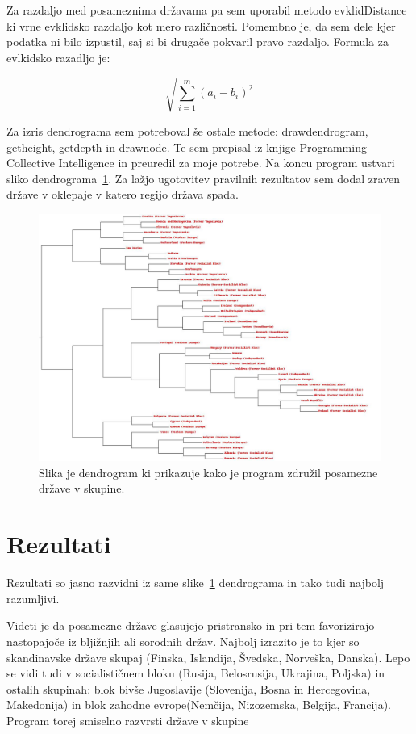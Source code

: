 \documentclass[a4paper,11pt]{article}
\begin{document}
Za razdaljo med posameznima državama pa sem uporabil metodo evklidDistance ki vrne evklidsko razdaljo kot mero različnosti. Pomembno je, da sem dele kjer podatka ni bilo izpustil, saj si bi drugače pokvaril pravo razdaljo. Formula za evlkidsko razadljo je:

\begin{equation}
\sqrt{ 
\sum\limits_{i=1}^{m}(a_{i}-b_{i})^{2}
}
\end{equation}


Za izris dendrograma sem potreboval še ostale metode: drawdendrogram, getheight, getdepth in drawnode. Te sem prepisal iz knjige Programming Collective Intelligence in preuredil za moje potrebe. Na koncu program ustvari sliko dendrograma~\ref{slika1}. Za lažjo ugotovitev pravilnih rezultatov sem dodal zraven države v oklepaje v katero regijo država spada.

\begin{figure}[htbp]
\begin{center}
\includegraphics[scale=0.3]{final-dendrogram.jpg}
\caption{Slika je dendrogram ki prikazuje kako je program združil posamezne države v skupine.}
\label{slika1}
\end{center}
\end{figure}

\section{Rezultati}

Rezultati so jasno razvidni iz same slike~\ref{slika1} dendrograma in tako tudi najbolj razumljivi.

Videti je da posamezne države glasujejo pristransko in pri tem favorizirajo nastopajoče iz bljižnjih ali sorodnih držav. Najbolj izrazito je to kjer so skandinavske države skupaj (Finska, Islandija, Švedska, Norveška, Danska). Lepo se vidi tudi v socialističnem bloku (Rusija, Belosrusija, Ukrajina, Poljska) in ostalih skupinah: blok bivše Jugoslavije (Slovenija, Bosna in Hercegovina, Makedonija) in blok zahodne evrope(Nemčija, Nizozemska, Belgija, Francija). Program torej smiselno razvrsti države v skupine
\end{document}

